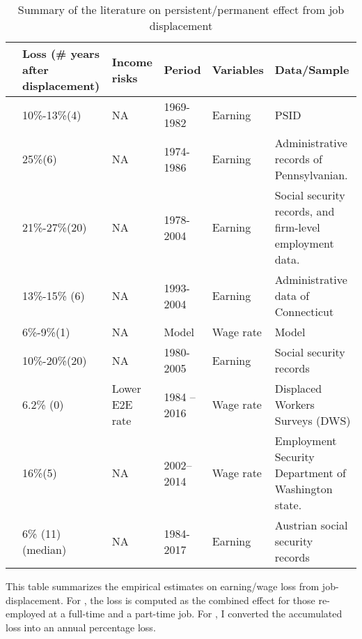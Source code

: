 	\begin{sidewaystable}[p]
\centering
\begin{adjustbox}{width={\textwidth}}
\begin{threeparttable}
\caption{Summary of the literature on persistent/permanent effect from job displacement}
\label{tab:scarring_literature}
\begin{tabular}{llllll}
\hline

                              & Loss (# years after displacement) & Income risks   & Period     & Variables & Data/Sample                                              \\
\hline
 

\cite{ruhm1991workers}        & 10\%-13\%(4)                      & NA             & 1969-1982  & Earning   & PSID                                                     \\
\cite{jacobson1993earnings}   & 25\%(6)                           & NA             & 1974-1986  & Earning   & Administrative records of Pennsylvanian.                 \\
\cite{von2009long}            & 21\%-27\%(20)                     & NA             & 1978-2004  & Earning   & Social security records, and firm-level employment data. \\
\cite{couch2010earnings}      & 13\%-15\% (6)                     & NA             & 1993-2004  & Earning   & Administrative data of Connecticut                       \\
\cite{low2010wage}            & 6\%-9\%(1)                        & NA             & Model      & Wage rate & Model                                                    \\
\cite{davis2011recessions}    & 10\%-20\%(20)                     & NA             & 1980-2005  & Earning   & Social security records                                  \\
\cite{farber2017employment}   & 6.2\% (0)                         & Lower E2E rate & 1984 –2016 & Wage rate & Displaced Workers Surveys (DWS)                          \\
\cite{lachowska2020sources}   & 16\%(5)                           & NA             & 2002–2014  & Wage rate & Employment Security Department of Washington state.      \\
\cite{pytka2021understanding} & 6\% (11) (median)                 & NA             & 1984-2017  & Earning   & Austrian social security records      \\
\hline
\hline

\end{tabular}
	\begin{flushleft}
\item This table summarizes the empirical estimates on earning/wage loss from job-displacement. For \cite{farber2017employment}, the loss is computed as the combined effect for those re-employed at a full-time and a part-time job. For \cite{pytka2021understanding}, I converted the accumulated loss into an annual  percentage loss.  \end{flushleft}
\end{threeparttable}
\end{adjustbox}
	\end{sidewaystable}

